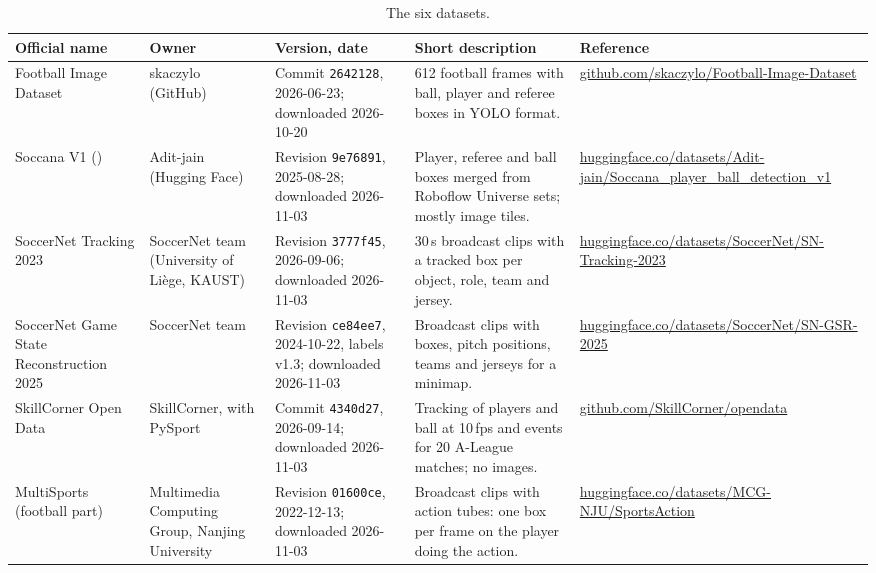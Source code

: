 \documentclass[11pt, a4paper]{article}
\begin{document}
\begin{table}[ht]
\centering\scriptsize
\begin{tabularx}{\textwidth}{@{}>{\raggedright\arraybackslash}p{2.0cm} >{\raggedright\arraybackslash}p{2.1cm} >{\raggedright\arraybackslash}p{2.3cm} L >{\raggedright\arraybackslash}p{3.3cm}@{}}
\toprule
\textbf{Official name} & \textbf{Owner} & \textbf{Version, date} & \textbf{Short description} & \textbf{Reference} \\
\midrule
Football Image Dataset & skaczylo (GitHub) & Commit \texttt{2642128}, 2026-06-23; downloaded 2026-10-20 & 612 football frames with ball, player and referee boxes in YOLO format. & \url{github.com/skaczylo/Football-Image-Dataset} \\
Soccana V1 () & Adit-jain (Hugging Face) & Revision \texttt{9e76891}, 2025-08-28; downloaded 2026-11-03 & Player, referee and ball boxes merged from Roboflow Universe sets; mostly image tiles. & \url{huggingface.co/datasets/Adit-jain/Soccana_player_ball_detection_v1} \\
SoccerNet Tracking 2023 & SoccerNet team (University of Liège, KAUST) & Revision \texttt{3777f45}, 2026-09-06; downloaded 2026-11-03 & 30\,s broadcast clips with a tracked box per object, role, team and jersey. & \url{huggingface.co/datasets/SoccerNet/SN-Tracking-2023} \\
SoccerNet Game State Reconstruction 2025 & SoccerNet team & Revision \texttt{ce84ee7}, 2024-10-22, labels v1.3; downloaded 2026-11-03 & Broadcast clips with boxes, pitch positions, teams and jerseys for a minimap. & \url{huggingface.co/datasets/SoccerNet/SN-GSR-2025} \\
SkillCorner Open Data & SkillCorner, with PySport & Commit \texttt{4340d27}, 2026-09-14; downloaded 2026-11-03 & Tracking of players and ball at 10\,fps and events for 20 A-League matches; no images. & \url{github.com/SkillCorner/opendata} \\
MultiSports (football part) & Multimedia Computing Group, Nanjing University & Revision \texttt{01600ce}, 2022-12-13; downloaded 2026-11-03 & Broadcast clips with action tubes: one box per frame on the player doing the action. & \url{huggingface.co/datasets/MCG-NJU/SportsAction} \\
\bottomrule
\end{tabularx}
\caption{The six datasets.}
\label{tab:overview}
\end{table}

\end{document}
